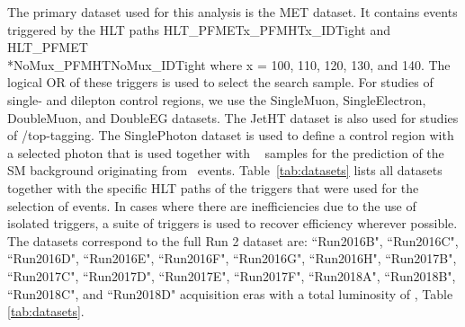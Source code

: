 \label{sec:samples}
The primary dataset used for this analysis is the MET dataset.
It contains events triggered by the HLT paths HLT\_PFMETx\_PFMHTx\_IDTight and HLT\_PFMET\\*NoMux\_PFMHTNoMux\_IDTight where x = 100, 110, 120, 130, and 140. The logical OR of these triggers is used to select the search sample. 
 For studies of single- and dilepton control regions, we use the SingleMuon, SingleElectron, DoubleMuon, and DoubleEG datasets. The JetHT dataset is also used for studies of \W/top-tagging. The SinglePhoton dataset is used to define a control region with a selected photon that is used together with \Zll~  samples for the prediction of the SM background originating from \Znunu~events. Table~\ref{tab:datasets} lists all datasets together with the specific HLT paths of the triggers that were used for the selection of events. In cases where there are inefficiencies due to the use of isolated triggers, a suite of triggers is used to recover efficiency wherever possible. The datasets correspond to the full Run 2 dataset are: ``Run2016B", ``Run2016C", ``Run2016D", ``Run2016E", ``Run2016F", ``Run2016G", ``Run2016H", ``Run2017B", ``Run2017C", ``Run2017D", ``Run2017E", ``Run2017F", ``Run2018A", ``Run2018B", ``Run2018C", and ``Run2018D" acquisition eras with a total luminosity of \datalumi, Table \ref{tab:datasets}.

